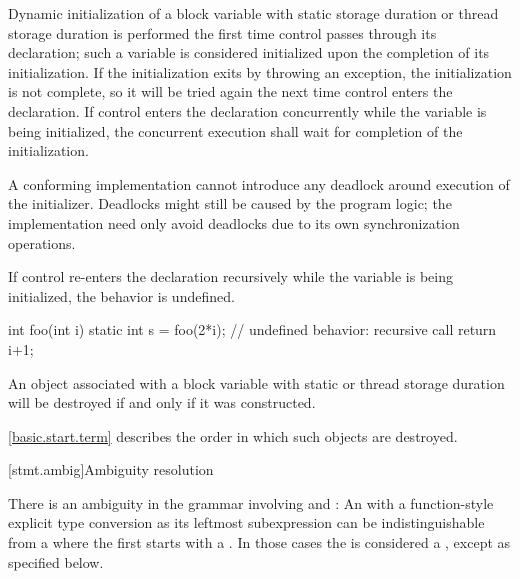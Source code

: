 \pnum
{}%
%
%
%
Dynamic initialization of a block variable with
static storage duration or
thread storage duration is performed
the first time control passes through its declaration; such a variable is
considered initialized upon the completion of its initialization. If the
initialization exits by throwing an exception, the initialization is not
complete, so it will be tried again the next time control enters the
declaration.
If control enters the declaration concurrently while the variable is
being initialized, the concurrent execution shall wait for completion
of the initialization.
\begin{note}
A conforming implementation cannot introduce
any deadlock around execution of the initializer.
Deadlocks might still be caused by the program logic;
the implementation need only avoid deadlocks
due to its own synchronization operations.
\end{note}
If control
re-enters the declaration recursively while
the variable is being initialized, the behavior is undefined.
\begin{example}
\begin{codeblock}
int foo(int i) {
  static int s = foo(2*i);      // undefined behavior: recursive call
  return i+1;
}
\end{codeblock}
\end{example}

\pnum
{}%
An object associated with
a block variable with static or thread storage duration
will be destroyed if and only if it was constructed.
\begin{note}
\ref{basic.start.term} describes the order in which such objects are destroyed.
\end{note}

[stmt.ambig]{Ambiguity resolution}%

\pnum
There is an ambiguity in the grammar involving
 and : An
 with a function-style explicit type
conversion as its leftmost subexpression can be
indistinguishable from a  where the first
 starts with a \tcode{(}. In those cases the
 is considered a ,
except as specified below.

